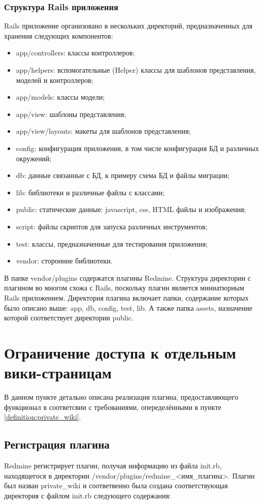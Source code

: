 \subsubsection{Структура Rails приложения}
Rails приложение организовано в нескольких директорий, предназначенных для
хранения следующих компонентов:
\begin{itemize}
\item app/controllers: классы контроллеров;
\item app/helpers: вспомогательные (Helper) классы для шаблонов представления,
моделей и контроллеров;
\item app/models: классы модели;
\item app/view: шаблоны представления;
\item app/view/layouts: макеты для шаблонов представления;
\item config: конфигурация приложения, в том числе конфигурация БД и различных
окружений;
\item db: данные связанные с БД, к примеру схема БД и файлы миграции;
\item lib: библиотеки и различные файлы с классами;
\item public: статические данные: javascript, css, HTML файлы и изображения;
\item script: файлы скриптов для запуска различных инструментов;
\item test: классы, предназначенные для тестирования приложения;
\item vendor: сторонние библиотеки.
\end{itemize}
В папке vendor/plugins содержатся плагины Redmine. Структура директории с
плагином во многом схожа с Rails, поскольку плагин является миниатюрным Rails
приложением. Директория плагина включает папки, содержание которых
было описано выше: app, db, config, test, lib. А также папка assets, назначение
которой соответствует директории public.


\section{Ограничение доступа к отдельным вики-страницам}
В данном пункте детально описана реализация плагина,
предоставляющего функционал в соответсвии с требованиями, опеределёнными
в пункте \ref{definition:private_wiki}.

\subsection{Регистрация плагина}
Redmine регистрирует плагин, получая информацию из файла init.rb, находящегося
в директории /vendor/plugins/redmine\_<имя\_плагина>. Плагин был назван
private\_wiki и соответвенно была создана соответствующая директория с файлом
init.rb следующего содержания:

